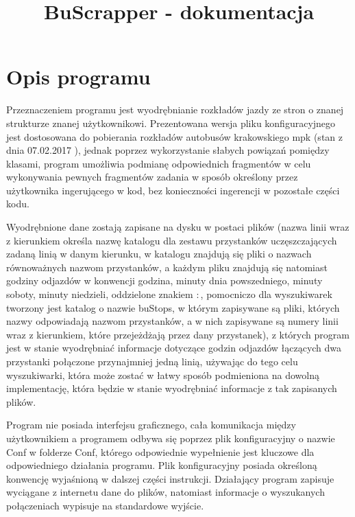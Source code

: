\documentclass[11pt]{article}
\title{BuScrapper - dokumentacja}
\begin{document}
\maketitle

\tableofcontents

\section{Opis programu}
Przeznaczeniem programu jest wyodrębnianie rozkładów jazdy ze stron o znanej strukturze znanej użytkownikowi. Prezentowana wersja pliku konfiguracyjnego jest dostosowana do pobierania rozkładów autobusów krakowskiego mpk (stan z dnia 07.02.2017 ), jednak poprzez wykorzystanie słabych powiązań pomiędzy klasami, program umożliwia podmianę odpowiednich fragmentów w celu wykonywania pewnych fragmentów zadania w sposób określony przez użytkownika ingerującego w kod, bez konieczności ingerencji w pozostałe części kodu.\newline

Wyodrębnione dane zostają zapisane na dysku w postaci plików (nazwa linii wraz z kierunkiem określa nazwę katalogu dla zestawu przystanków uczęszczających zadaną linią w danym kierunku, w katalogu znajdują się pliki o nazwach równoważnych nazwom przystanków, a każdym pliku znajdują się natomiast godziny odjazdów w konwencji godzina, minuty dnia powszedniego, minuty soboty, minuty niedzieli, oddzielone znakiem $\colon$, pomocniczo dla wyszukiwarek tworzony jest katalog o nazwie buStops, w którym zapisywane są pliki, których nazwy odpowiadają nazwom przystanków, a w nich zapisywane są numery linii wraz z kierunkiem, które przejeżdżają przez dany przystanek), z których program jest w stanie wyodrębniać informacje dotyczące godzin odjazdów łączących dwa przystanki połączone przynajmniej jedną linią, używając do tego celu wyszukiwarki, która może zostać w łatwy sposób podmieniona na dowolną implementację, która będzie w stanie wyodrębniać informacje z tak zapisanych plików.\newline

Program nie posiada interfejsu graficznego, cała komunikacja między użytkownikiem a programem odbywa się poprzez plik konfiguracyjny o nazwie Conf w folderze Conf, którego odpowiednie wypełnienie jest kluczowe dla odpowiedniego działania programu. Plik konfiguracyjny posiada określoną konwencję wyjaśnioną w dalszej części instrukcji. Działający program zapisuje wyciągane z internetu dane do plików, natomiast informacje o wyszukanych połączeniach wypisuje na standardowe wyjście.
\end{document}
